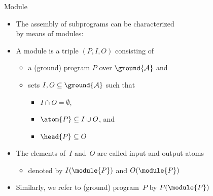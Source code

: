 \newcommand{\QRG}{\ensuremath{Q}}
\newcommand{\RRG}{\ensuremath{R}}
\begin{frame}[c]{Module}
  \begin{itemize}
  \item<1-> The assembly of subprograms can be characterized\\ by means of modules:
    \bigskip
  \item<2-> A \alert{module}  is a triple
    \(
    (P,I,O)
    \)
    consisting of
    \begin{itemize}\normalsize
    \item a (ground) program $P$ over $\ground{\mathcal{A}}$
      and
    \item sets $I,O\subseteq\ground{\mathcal{A}}$ such that
      \begin{itemize}\normalsize
      \item $I\cap O=\emptyset$,
      \item $\atom{P}\subseteq I\cup O$, and
      \item $\head{P}\subseteq O$
      \end{itemize}
    \end{itemize}
    \medskip
  \item<3-> The elements of~$I$ and~$O$ are called \alert{input} and \alert{output atoms}
    \begin{itemize}
    \item<4-> denoted by $I(\module{P})$ and $O(\module{P})$
    \end{itemize}
  \item<5-> Similarly, we refer to (ground) \alert{program}~$P$ by $P(\module{P})$
  \end{itemize}
\end{frame}
